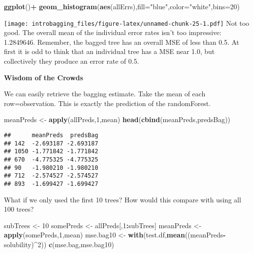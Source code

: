 \documentclass[]{article}
\newenvironment{Shaded}{\begin{snugshade}}{\end{snugshade}}
\newcommand{\DataTypeTok}[1]{\textcolor[rgb]{0.13,0.29,0.53}{#1}}
\newcommand{\DecValTok}[1]{\textcolor[rgb]{0.00,0.00,0.81}{#1}}
\newcommand{\KeywordTok}[1]{\textcolor[rgb]{0.13,0.29,0.53}{\textbf{#1}}}
\newcommand{\NormalTok}[1]{#1}
\newcommand{\OperatorTok}[1]{\textcolor[rgb]{0.81,0.36,0.00}{\textbf{#1}}}
\newcommand{\StringTok}[1]{\textcolor[rgb]{0.31,0.60,0.02}{#1}}
\begin{document}
\begin{Shaded}
\begin{Highlighting}[]
\KeywordTok{ggplot}\NormalTok{()}\OperatorTok{+}
\StringTok{  }\KeywordTok{geom_histogram}\NormalTok{(}\KeywordTok{aes}\NormalTok{(allErrs),}\DataTypeTok{fill=}\StringTok{"blue"}\NormalTok{,}\DataTypeTok{color=}\StringTok{"white"}\NormalTok{,}\DataTypeTok{bins=}\DecValTok{20}\NormalTok{)}
\end{Highlighting}
\end{Shaded}

\texttt{[image: introbagging\_files/figure-latex/unnamed-chunk-25-1.pdf]}
Not too good. The overall mean of the individual error rates isn't too
impressive: 1.2849646. Remember, the bagged tree has an overall MSE of
less than 0.5. At first it is odd to think that an individual tree has a
MSE near 1.0, but collectively they produce an error rate of 0.5.

\textbf{Wisdom of the Crowds}

We can easily retrieve the bagging estimate. Take the mean of each
row=observation. This is exactly the prediction of the randomForest.

\begin{Shaded}
\begin{Highlighting}[]
\NormalTok{meanPreds <-}\StringTok{ }\KeywordTok{apply}\NormalTok{(allPreds,}\DecValTok{1}\NormalTok{,mean)}
\KeywordTok{head}\NormalTok{(}\KeywordTok{cbind}\NormalTok{(meanPreds,predsBag))}
\end{Highlighting}
\end{Shaded}

\begin{verbatim}
##      meanPreds  predsBag
## 142  -2.693187 -2.693187
## 1050 -1.771842 -1.771842
## 670  -4.775325 -4.775325
## 90   -1.980210 -1.980210
## 712  -2.574527 -2.574527
## 893  -1.699427 -1.699427
\end{verbatim}

What if we only used the first 10 trees? How would this compare with
using all 100 trees?

\begin{Shaded}
\begin{Highlighting}[]
\NormalTok{subTrees <-}\StringTok{ }\DecValTok{10}
\NormalTok{somePreds <-}\StringTok{ }\NormalTok{allPreds[,}\DecValTok{1}\OperatorTok{:}\NormalTok{subTrees]}
\NormalTok{meanPreds <-}\StringTok{ }\KeywordTok{apply}\NormalTok{(somePreds,}\DecValTok{1}\NormalTok{,mean)}
\NormalTok{mse.bag10 <-}\StringTok{ }\KeywordTok{with}\NormalTok{(test.df,}\KeywordTok{mean}\NormalTok{((meanPreds}\OperatorTok{-}\NormalTok{solubility)}\OperatorTok{^}\DecValTok{2}\NormalTok{))}
\KeywordTok{c}\NormalTok{(mse.bag,mse.bag10)}
\end{Highlighting}
\end{Shaded}
\end{document}
